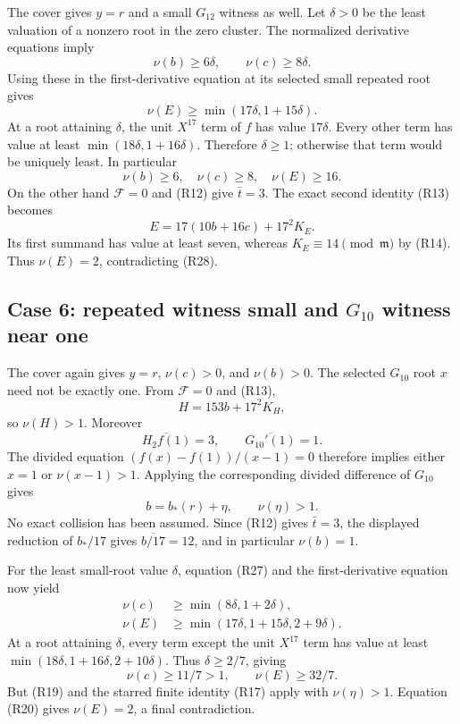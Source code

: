 \documentclass[
  british,
  10pt,
  a4paper,
]{article}
\begin{document}
The cover gives \(y=r\) and a small \(G_{12}\) witness as well. Let
\(\delta>0\) be the least valuation of a nonzero root in the zero
cluster. The normalized derivative equations imply \[
\nu(b)\geq6\delta,\qquad \nu(c)\geq8\delta.
\] Using these in the first-derivative equation at its selected small
repeated root gives \[
\nu(E)\geq\min(17\delta,1+15\delta).                           \tag{R28}
\] At a root attaining \(\delta\), the unit \(X^{17}\) term of \(f\) has
value \(17\delta\). Every other term has value at least
\(\min(18\delta,1+16\delta)\). Therefore \(\delta\geq1\); otherwise that
term would be uniquely least. In particular \[
\nu(b)\geq6,\quad \nu(c)\geq8,\quad \nu(E)\geq16.
\] On the other hand \(\mathcal F=0\) and (R12) give \(\bar t=3\). The
exact second identity (R13) becomes \[
E=17(10b+16c)+17^2K_E.
\] Its first summand has value at least seven, whereas
\(K_E\equiv14\pmod{\mathfrak m}\) by (R14). Thus \(\nu(E)=2\),
contradicting (R28).

\subsection{\texorpdfstring{Case 6: repeated witness small and
\(G_{10}\) witness near
one}{Case 6: repeated witness small and G\_\{10\} witness near one}}\label{case-6-repeated-witness-small-and-g_10-witness-near-one}

The cover again gives \(y=r\), \(\nu(c)>0\), and \(\nu(b)>0\). The
selected \(G_{10}\) root \(x\) need not be exactly one. From
\(\mathcal F=0\) and (R13), \[
H=153b+17^2K_H,
\] so \(\nu(H)>1\). Moreover \[
\overline{H_2f(1)}=3,\qquad \overline{G_{10}'(1)}=1.
\] The divided equation \((f(x)-f(1))/(x-1)=0\) therefore implies either
\(x=1\) or \(\nu(x-1)>1\). Applying the corresponding divided difference
of \(G_{10}\) gives \[
b=b_*(r)+\eta,\qquad \nu(\eta)>1.
\] No exact collision has been assumed. Since (R12) gives \(\bar t=3\),
the displayed reduction of \(b_*/17\) gives \(\overline{b/17}=12\), and
in particular \(\nu(b)=1\).

For the least small-root value \(\delta\), equation (R27) and the
first-derivative equation now yield \[
\begin{aligned}
\nu(c)&\geq\min(8\delta,1+2\delta),\\
\nu(E)&\geq\min(17\delta,1+15\delta,2+9\delta).
\end{aligned}                                                \tag{R29}
\] At a root attaining \(\delta\), every term except the unit \(X^{17}\)
term has value at least \(\min(18\delta,1+16\delta,2+10\delta)\). Thus
\(\delta\geq2/7\), giving \[
\nu(c)\geq11/7>1,\qquad \nu(E)\geq32/7.
\] But (R19) and the starred finite identity (R17) apply with
\(\nu(\eta)>1\). Equation (R20) gives \(\nu(E)=2\), a final
contradiction.
\end{document}
